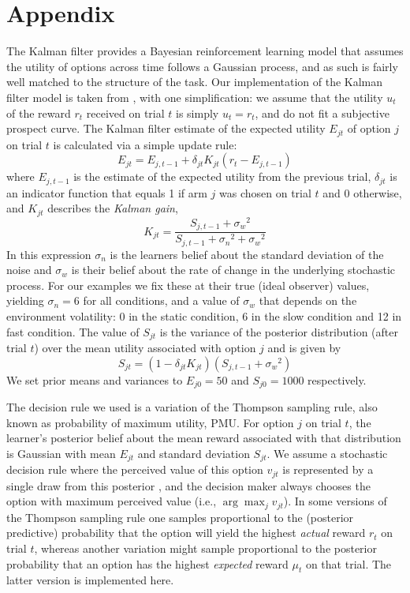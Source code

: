 \documentclass[a4paper,doc,natbib]{apa6}
\begin{document}


\section{Appendix}

The Kalman filter provides a Bayesian reinforcement learning model that assumes the utility of options across time follows a Gaussian process, and as such is fairly well matched to the structure of the task. Our implementation of the Kalman filter model is taken from \citet{speekenbrink2015uncertainty}, with one simplification: we assume that the utility $u_t$ of the reward $r_t$ received on trial $t$ is simply  $u_t = r_t$, and do not fit a subjective prospect curve. The Kalman filter estimate of the expected utility $E_{jt}$ of option $j$ on trial $t$ is calculated via a simple update rule:
$$
E_{jt} = E_{j,t-1} + \delta_{jt} K_{jt} \left( r_t - E_{j,t-1} \right)
$$
where $E_{j,t-1}$ is the estimate of the expected utility from the previous trial, $\delta_{jt}$ is an indicator function that equals 1 if arm $j$ was chosen on trial $t$ and 0 otherwise, and $K_{jt}$ describes the {\it Kalman gain},
$$
K_{jt} = \frac{S_{j,t-1} + {\sigma_w}^2}{S_{j,t-1} + {\sigma_n}^2 +  {\sigma_w}^2}
$$
In this expression $\sigma_n$ is the learners belief about the standard deviation of the noise and $\sigma_w$ is their belief about the rate of change in the underlying stochastic process. For our examples we fix these at their true (ideal observer) values, yielding $\sigma_n = 6$ for all conditions, and a value of $\sigma_w$ that depends on the environment volatility: 0 in the static condition, 6 in the slow condition and 12 in fast condition. The value of $S_{jt}$ is the variance of the posterior distribution (after trial $t$) over the mean utility associated with option $j$ and is given by
$$
S_{jt} = (1-\delta_{jt} K_{jt})(S_{j,t-1} + {\sigma_w}^2)
$$
We set prior means and variances to  $E_{j0} = 50$ and $S_{j0} = 1000$ respectively.

The decision rule we used is a variation of the Thompson sampling rule, also known as probability of maximum utility, PMU. For option $j$ on trial $t$, the learner's posterior belief about the mean reward associated with that distribution is Gaussian with mean $E_{jt}$ and standard deviation $S_{jt}$. We assume a stochastic decision rule where the perceived value of this option $v_{jt}$ is represented by a single draw from this posterior \citep{vul2014one}, and the decision maker always chooses the option with maximum perceived value (i.e., $\arg \max_j v_{jt}$). In some versions of the Thompson sampling rule one samples proportional to the (posterior predictive) probability that the option will yield the highest {\it actual} reward $r_t$ on trial $t$, whereas another variation might sample proportional to the posterior probability that an option has the highest {\it expected} reward $\mu_t$ on that trial. The latter version is implemented here.
\end{document}
